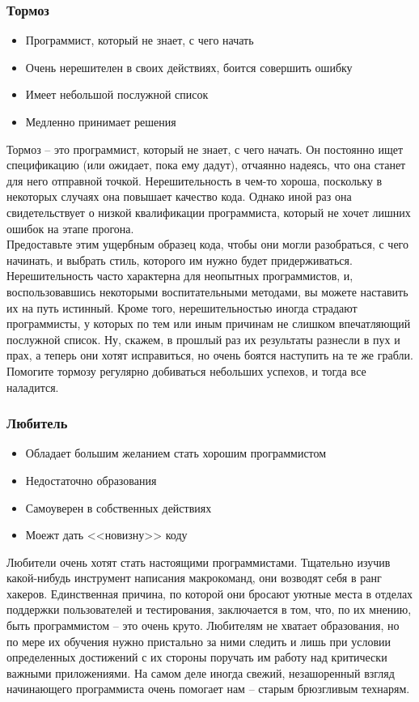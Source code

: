 \documentclass{../industrial-development}
\begin{document}
{\begin{frame} \frametitle{Тормоз}
	\begin{itemize}
		\item Программист, который не знает, с чего начать
		\item Очень нерешителен в своих действиях, боится совершить ошибку
		\item Имеет небольшой послужной список
		\item Медленно принимает решения
	\end{itemize}
\end{frame}
\lecturenotes
Тормоз – это программист, который не знает, с чего начать. Он постоянно ищет спецификацию (или ожидает, пока ему дадут), отчаянно надеясь, что она станет для него отправной точкой. Нерешительность в чем-то хороша, поскольку в некоторых случаях она повышает качество кода. Однако иной раз она свидетельствует о низкой квалификации программиста, который не хочет лишних ошибок на этапе прогона.  \\ 
Предоставьте этим ущербным образец кода, чтобы они могли разобраться, с чего начинать, и выбрать стиль, которого им нужно будет придерживаться. Нерешительность часто характерна для неопытных программистов, и, воспользовавшись некоторыми воспитательными методами, вы можете наставить их на путь истинный. Кроме того, нерешительностью иногда страдают программисты, у которых по тем или иным причинам не слишком впечатляющий послужной список. Ну, скажем, в прошлый раз их результаты разнесли в пух и прах, а теперь они хотят исправиться, но очень боятся наступить на те же грабли. Помогите тормозу регулярно добиваться небольших успехов, и тогда все наладится. 

\begin{frame} \frametitle{Любитель}
	\begin{itemize}
		\item Обладает большим желанием стать хорошим программистом
		\item Недостаточно образования
		\item Самоуверен в собственных действиях
		\item Моежт дать <<новизну>> коду
	\end{itemize}
\end{frame}
\lecturenotes
Любители очень хотят стать настоящими программистами. Тщательно изучив какой-нибудь инструмент написания макрокоманд, они возводят себя в ранг хакеров. Единственная причина, по которой они бросают уютные места в отделах поддержки пользователей и тестирования, заключается в том, что, по их мнению, быть программистом – это очень круто. 
Любителям не хватает образования, но по мере их обучения нужно пристально за ними следить и лишь при условии определенных достижений с их стороны поручать им работу над критически важными приложениями. На самом деле иногда свежий, незашоренный взгляд начинающего программиста очень помогает нам – старым брюзгливым технарям.


}
\end{document}

